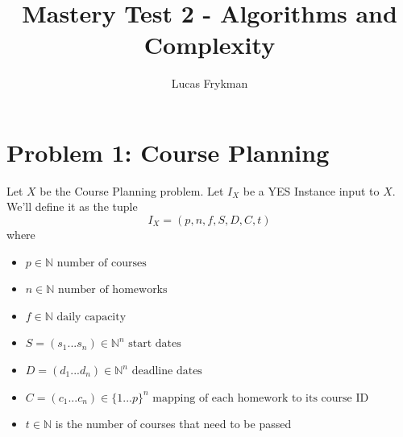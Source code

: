 \documentclass[11pt]{article}
\title{Mastery Test 2 - Algorithms and Complexity}
\author{Lucas Frykman}
\date{}
\begin{document}
\notag

\maketitle

\section{Problem 1: Course Planning}
Let $X$ be the Course Planning problem. Let $I_X$ be a YES Instance input to $X$. We'll define it as the tuple 
$$I_X = (p,n,f,S,D,C,t)$$ where 
\begin{itemize}
    \item $p\in \mathbb{N} \text{ number of courses}$ 
    \item $n\in \mathbb{N} \text{ number of homeworks}$ 
    \item $f\in \mathbb{N} \text{ daily capacity}$ 
    \item $S = (s_1...s_n)\in \mathbb{N}^n \text{ start dates}$ 
    \item $D = (d_1...d_n)\in \mathbb{N}^n \text{ deadline dates}$ 
    \item $C = (c_1...c_n)\in \{1...p\}^n \text{ mapping of each homework to its course ID}$
    \item $t \in \mathbb{N}$ is the number of courses that need to be passed
\end{itemize}
\end{document}
